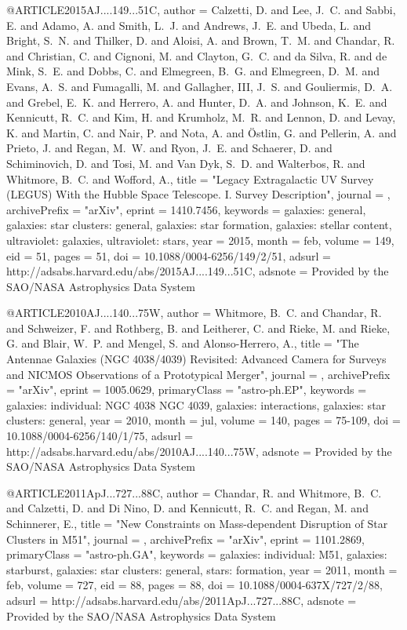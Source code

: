 @ARTICLE{2015AJ....149...51C,
   author = {{Calzetti}, D. and {Lee}, J.~C. and {Sabbi}, E. and {Adamo}, A. and 
	{Smith}, L.~J. and {Andrews}, J.~E. and {Ubeda}, L. and {Bright}, S.~N. and 
	{Thilker}, D. and {Aloisi}, A. and {Brown}, T.~M. and {Chandar}, R. and 
	{Christian}, C. and {Cignoni}, M. and {Clayton}, G.~C. and {da Silva}, R. and 
	{de Mink}, S.~E. and {Dobbs}, C. and {Elmegreen}, B.~G. and 
	{Elmegreen}, D.~M. and {Evans}, A.~S. and {Fumagalli}, M. and 
	{Gallagher}, III, J.~S. and {Gouliermis}, D.~A. and {Grebel}, E.~K. and 
	{Herrero}, A. and {Hunter}, D.~A. and {Johnson}, K.~E. and {Kennicutt}, R.~C. and 
	{Kim}, H. and {Krumholz}, M.~R. and {Lennon}, D. and {Levay}, K. and 
	{Martin}, C. and {Nair}, P. and {Nota}, A. and {{\"O}stlin}, G. and 
	{Pellerin}, A. and {Prieto}, J. and {Regan}, M.~W. and {Ryon}, J.~E. and 
	{Schaerer}, D. and {Schiminovich}, D. and {Tosi}, M. and {Van Dyk}, S.~D. and 
	{Walterbos}, R. and {Whitmore}, B.~C. and {Wofford}, A.},
    title = "{Legacy Extragalactic UV Survey (LEGUS) With the Hubble Space Telescope. I. Survey Description}",
  journal = {\aj},
archivePrefix = "arXiv",
   eprint = {1410.7456},
 keywords = {galaxies: general, galaxies: star clusters: general, galaxies: star formation, galaxies: stellar content, ultraviolet: galaxies, ultraviolet: stars},
     year = 2015,
    month = feb,
   volume = 149,
      eid = {51},
    pages = {51},
      doi = {10.1088/0004-6256/149/2/51},
   adsurl = {http://adsabs.harvard.edu/abs/2015AJ....149...51C},
  adsnote = {Provided by the SAO/NASA Astrophysics Data System}
}

@ARTICLE{2010AJ....140...75W,
   author = {{Whitmore}, B.~C. and {Chandar}, R. and {Schweizer}, F. and 
	{Rothberg}, B. and {Leitherer}, C. and {Rieke}, M. and {Rieke}, G. and 
	{Blair}, W.~P. and {Mengel}, S. and {Alonso-Herrero}, A.},
    title = "{The Antennae Galaxies (NGC 4038/4039) Revisited: Advanced Camera for Surveys and NICMOS Observations of a Prototypical Merger}",
  journal = {\aj},
archivePrefix = "arXiv",
   eprint = {1005.0629},
 primaryClass = "astro-ph.EP",
 keywords = {galaxies: individual: NGC 4038 NGC 4039, galaxies: interactions, galaxies: star clusters: general},
     year = 2010,
    month = jul,
   volume = 140,
    pages = {75-109},
      doi = {10.1088/0004-6256/140/1/75},
   adsurl = {http://adsabs.harvard.edu/abs/2010AJ....140...75W},
  adsnote = {Provided by the SAO/NASA Astrophysics Data System}
}

@ARTICLE{2011ApJ...727...88C,
   author = {{Chandar}, R. and {Whitmore}, B.~C. and {Calzetti}, D. and {Di Nino}, D. and 
	{Kennicutt}, R.~C. and {Regan}, M. and {Schinnerer}, E.},
    title = "{New Constraints on Mass-dependent Disruption of Star Clusters in M51}",
  journal = {\apj},
archivePrefix = "arXiv",
   eprint = {1101.2869},
 primaryClass = "astro-ph.GA",
 keywords = {galaxies: individual: M51, galaxies: starburst, galaxies: star clusters: general, stars: formation},
     year = 2011,
    month = feb,
   volume = 727,
      eid = {88},
    pages = {88},
      doi = {10.1088/0004-637X/727/2/88},
   adsurl = {http://adsabs.harvard.edu/abs/2011ApJ...727...88C},
  adsnote = {Provided by the SAO/NASA Astrophysics Data System}
}

